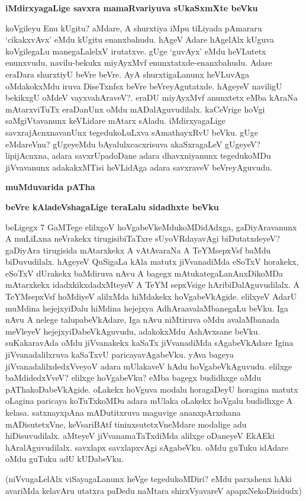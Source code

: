 \textbf{iMdirxyagaLige savxra mamaRvariyuva sUkaSxmXte beVku}

koVgileyu Enu kUgitu? aMdare, A shurxtiya iMpu tiLiyada pAmararu `cikakxvAvx' eMdu kUgitu enanxbahudu. hAgeV Adare hAgelAlx kUguva koVgilegaLu manegaLalelxV irutatxve. gUge `guvAyx' eMdu heVLutetx enunxvudu, navilu-bekukx miyAyxMvf enunxtatxde-enanxbahudu. Adare eraDara shurxtiyU beVre beVre. AyA shurxtigaLanunx heVLuvAga oMdakokxMdu iruva DiseTxnfsx beVre beVreyAgutatxde. hAgeyeV naviligU bekikxgU oMdeV vayxvahAraveV?. eraDU miyAyxMvf anunxtetx eMba kAraNa mAtarxviTuTx eraDanUnx oMdu mADalAguvudilalx. kaCeVrige hoVgi saMgiVtavanunx keVLidare mAtarx sAladu. iMdirxyagaLige savxrajAcnxnavanUnx tegedukoLuLxva sAmathayxRvU beVku. gUge eMdareVnu? gUgeyeMdu bAyalulxcacxrisuva akaSxragaLeV gUgeyeV? lipijAcnxna, adara savxrUpadoDane adara dhavxniyanunx tegedukoMDu jiVvavanunx adakakxMTisi heVLidAga adara savxraveV beVreyAguvudu. 

\textbf{muMduvarida pATha}

\textbf{beVre kAladeVshagaLige teraLalu sidadhxte beVku}

beLigegx 7 GaMTege elilxgoV hoVgabeVkeMdukoMDidAdxga, gaDiyAravanunx A muLiLxna neVrakekx tirugisibiTaTxre sUyoVRdayavAgi biDutatxdeyeV? gaDiyAra tirugisida mAtarxkekx A vAtAvaraNa A TeYMsepxVsf baMdu biDuvudilalx. hAgeyeV QuSigaLa kAla matutx jiVvanadiMda eSoTxV horakekx, eSoTxV dUrakekx baMdiruva nAvu A bagegx mAtukategaLanAnxDikoMDa mAtarxkekx idadxkikxdadxMteyeV A TeYM sepxVsige hAribiDalAguvudilalx. A TeYMsepxVsf hoMdiyeV alilxMda hiMdakekx hoVgabeVkAgide. elilxyeV AdarU muMdina hejejxyiDalu hiMdina hejejxya AdhAraavalaMbanegaLu beVku. Iga nAvu A nelege talupabeVkAdare, Iga nAvu niMtiruva oMdu avalaMbanada meVleyeV hejejxyiDabeVkAguvudu, adakokxMdu AshAvxsane beVku. suKakaravAda oMdu jiVvanakekx kaSaTx jiVvanadiMda sAgabeVkAdare Igina jiVvanadalilxruva kaSaTxvU paricayavAgabeVku. yAva bageya jiVvanadalilxdedxVveyoV adara mUlakaveV hAdu 
hoVgabeVkAguvudu. elilxge baMdidedxVveV? elilxge hoVgabeVku? eMba bagegx budidhxge oMdu pAThakoDabeVkAgide. oLakekx hoVguva modalu horagaDeyU horagina matutx oLagina paricaya koTuTxkoMDu adara mUlaka oLakekx hoVgalu budidhxge A kelasa. satxnayxpAna mADutitxruva maguvige ananxpArxshana mADisutetxVne, keVsariBAtf tininxsutetxVneMdare modalige adu hiDisuvudilalx. aMteyeV jiVvanamaTaTxdiMda alilxge oDaneyeV EkAEki hAralAguvudilalx. savxlapx savxlapxvAgi sAgabeVku. oMdu guTuku idAdare oMdu guTuku adU kUDabeVku.

(niVvugaLelAlx viSayagaLanunx heVge tegedukoMDiri? eMdu parxshenx hAki avariMda kelavAru utatxra paDedu naMtara shirxVyavareV apapxNekoDisidudx)

